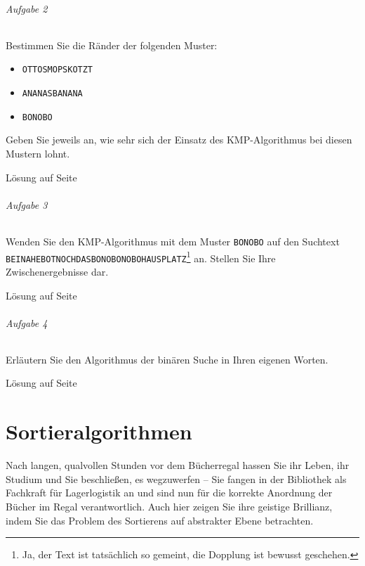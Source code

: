 \documentclass[11pt,a4paper]{scrartcl}
\begin{document}
\paragraph{Aufgabe 2} Bestimmen Sie die Ränder der folgenden Muster:
\begin{itemize}
\item \texttt{OTTOSMOPSKOTZT}
\item \texttt{ANANASBANANA}
\item \texttt{BONOBO}
\end{itemize}
Geben Sie jeweils an, wie sehr sich der Einsatz des KMP-Algorithmus bei diesen Mustern lohnt.
\begin{flushright}
Lösung auf Seite \pageref{a2.2:lsg}
\end{flushright}
\paragraph{Aufgabe 3} Wenden Sie den KMP-Algorithmus mit dem Muster \texttt{BONOBO} auf den Suchtext \texttt{BEINAHEBOTNOCHDASBONOBONOBOHAUSPLATZ}\footnote{Ja, der Text ist tatsächlich so gemeint, die Dopplung ist bewusst geschehen.} an. Stellen Sie Ihre Zwischenergebnisse dar.
\begin{flushright}
Lösung auf Seite \pageref{a2.3:lsg}
\end{flushright}
\paragraph{Aufgabe 4} Erläutern Sie den Algorithmus der binären Suche in Ihren eigenen Worten.
\begin{flushright}
Lösung auf Seite \pageref{a2.4:lsg}
\end{flushright}
\pagebreak
\part{Sortieralgorithmen}
Nach langen, qualvollen Stunden vor dem Bücherregal hassen Sie ihr Leben, ihr Studium und Sie beschließen, es wegzuwerfen -- Sie fangen in der Bibliothek als Fachkraft für Lagerlogistik an und sind nun für die korrekte Anordnung der Bücher im Regal verantwortlich. Auch hier zeigen Sie ihre geistige Brillianz, indem Sie das Problem des Sortierens auf abstrakter Ebene betrachten.
\end{document}
